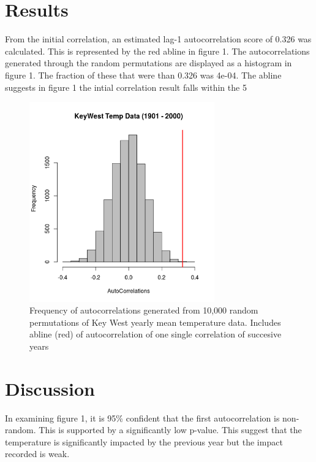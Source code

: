 \documentclass[12pt]{article}
\begin{document}
    \section{Results}
        From the initial correlation, an estimated lag-1 autocorrelation
        score of 0.326 was calculated. This is represented by the red 
        abline in figure 1. The autocorrelations generated through 
        the random permutations are displayed as a histogram in figure 1. The fraction of 
        these that were than 0.326 was 4e-04. The abline suggests 
        in figure 1 the intial correlation result falls within the 5%
        
            \begin{figure}[!h]
            \begin{center}
            \includegraphics[width=8cm]{../Results/Rplot.png}
            \caption{Frequency of autocorrelations generated from 10,000 random permutations of Key West yearly mean temperature data. 
                Includes abline (red) of autocorrelation of one single correlation of succesive years}
            \end{center}
            \end{figure}

    \section{Discussion}
        In examining figure 1, it is 95\% confident that the first autocorrelation is non-random. 
        This is supported by a significantly low p-value. This suggest that
        the temperature is significantly impacted by the previous year but the impact recorded is weak. 

    
\end{document}
